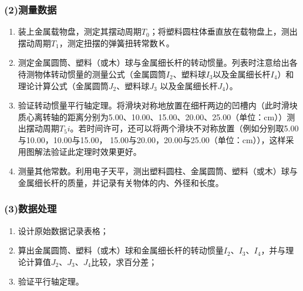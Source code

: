 \documentclass[11pt,a4paper,oneside]{article}
\begin{document}
\subsubsection*{(2)测量数据}
\begin{enumerate}
\item 装上金属载物盘，测定其摆动周期$T_0$；将塑料圆柱体垂直放在载物盘上，测出摆动周期$T_1$，测定扭摆的弹簧扭转常数Ｋ。
\item 测定金属圆筒、塑料（或木）球与金属细长杆的转动惯量。列表时注意给出各待测物体转动惯量的测量公式（金属圆筒$I_2$、塑料球$I_3$以及金属细长杆$I_4$）和理论计算公式（金属圆筒$J_2$、塑料球$J_3$ 以及金属细长杆$J_4$）。
\item 验证转动惯量平行轴定理。将滑块对称地放置在细杆两边的凹槽内（此时滑块质心离转轴的距离分别为5.00、10.00、15.00、20.00、25.00（单位：cm））测出摆动周期$T_5i$。若时间许可，还可以将两个滑块不对称放置（例如分别取5.00与10.00，10.00与15.00，
15.00与20.00，20.00与25.00（单位：cm）），这样采用图解法验证此定理时效果更好。
\item 测量其他常数。利用电子天平，测出塑料圆柱、金属圆筒、塑料（或木）球与金属细长杆的质量，并记录有关物体的内、外径和长度。
\end{enumerate}
\subsubsection*{(3)数据处理}
\begin{enumerate}
\item 设计原始数据记录表格；
\item 算出金属圆筒、塑料（或木）球和金属细长杆的转动惯量$I_2$、$I_3$、$I_4$，并与理论计算值$J_2$、$J_3$、$J_4$比较，求百分差；
\item 验证平行轴定理。
\end{enumerate}
\end{document}

